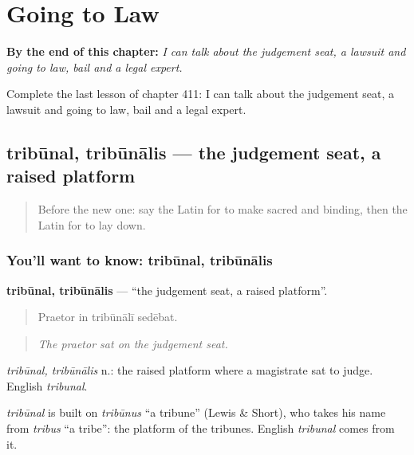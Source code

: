 
\chapter{Going to Law}
\label{ch:la-going-to-law}

\begin{chapteropening}
\textbf{By the end of this chapter:} \emph{I can talk about the judgement seat, a lawsuit and going to law, bail and a legal expert.}

Complete the last lesson of chapter 411: I can talk about the judgement seat, a lawsuit and going to law, bail and a legal expert.
\end{chapteropening}

\section[tribūnal, tribūnālis]{tribūnal, tribūnālis — the judgement seat, a raised platform}

\label{lesson:LA-C411-tribunal}



\begin{quote}
Before the new one: say the Latin for to make sacred and binding, then the Latin for to lay down.
\end{quote}

\subsection*{You'll want to know: tribūnal, tribūnālis}
\textbf{tribūnal, tribūnālis} — \textquotedblleft{}the judgement seat, a raised platform\textquotedblright{}.

\begin{quote}
Praetor in tribūnālī sedēbat.
\end{quote}

\begin{quote}
\emph{The praetor sat on the judgement seat.}
\end{quote}

\emph{tribūnal, tribūnālis} n.: the raised platform where a magistrate sat to judge. English \emph{tribunal}.

\begin{cousinweb}
\emph{tribūnal} is built on \emph{tribūnus} \textquotedblleft{}a tribune\textquotedblright{} (Lewis \& Short), who takes his name from \emph{tribus} \textquotedblleft{}a tribe\textquotedblright{}: the platform of the tribunes. English \emph{tribunal} comes from it.
\end{cousinweb}

